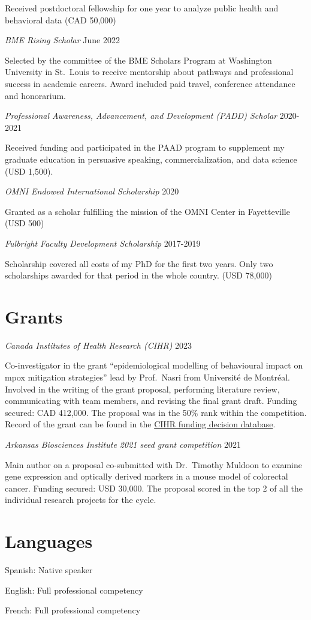 \documentclass[10pt,]{article}
\renewenvironment{itemize}{
  \begin{list}{}{
    \setlength{\leftmargin}{1.5em}
  }
}{
  \end{list}
}
\begin{document}
Received postdoctoral fellowship for one year to analyze public health
and behavioral data (CAD 50,000)

\emph{BME Rising Scholar} \hfill June 2022

Selected by the committee of the BME Scholars Program at Washington
University in St.~Louis to receive mentorship about pathways and
professional success in academic careers. Award included paid travel,
conference attendance and honorarium.

\emph{Professional Awareness, Advancement, and Development (PADD)
Scholar} \hfill 2020-2021

Received funding and participated in the PAAD program to supplement my
graduate education in persuasive speaking, commercialization, and data
science (USD 1,500).

\emph{OMNI Endowed International Scholarship} \hfill 2020

Granted as a scholar fulfilling the mission of the OMNI Center in
Fayetteville (USD 500)

\emph{Fulbright Faculty Development Scholarship} \hfill 2017-2019

Scholarship covered all costs of my PhD for the first two years. Only
two scholarships awarded for that period in the whole country. (USD
78,000)

\section{Grants}\label{grants}

\emph{Canada Institutes of Health Research (CIHR)} \hfill 2023

Co-investigator in the grant ``epidemiological modelling of behavioural
impact on mpox mitigation strategies'' lead by Prof.~Nasri from
Université de Montréal. Involved in the writing of the grant proposal,
performing literature review, communicating with team members, and
revising the final grant draft. Funding secured: CAD 412,000. The
proposal was in the 50\% rank within the competition. Record of the
grant can be found in the
\href{https://webapps.cihr-irsc.gc.ca/decisions/p/project_details.html?applId=481271&lang=en}{CIHR funding decision database}.

\emph{Arkansas Biosciences Institute 2021 seed grant competition }
\hfill 2021

Main author on a proposal co-submitted with Dr.~Timothy Muldoon to
examine gene expression and optically derived markers in a mouse model
of colorectal cancer. Funding secured: USD 30,000. The proposal scored
in the top 2 of all the individual research projects for the cycle.

\section{Languages}\label{languages}

\begin{itemize}
\item
  Spanish: Native speaker
\item
  English: Full professional competency
\item
  French: Full professional competency
\end{itemize}
\end{document}
